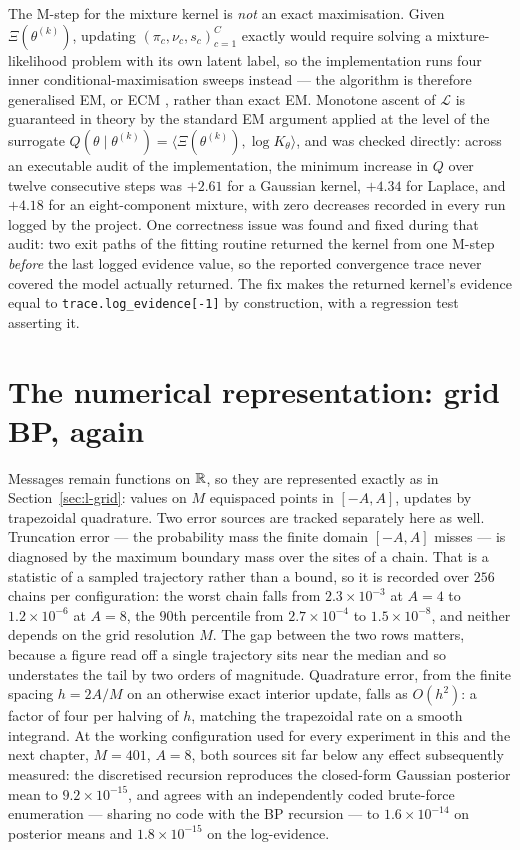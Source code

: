 The M-step for the mixture kernel is \emph{not} an exact maximisation. Given
$\Xi(\theta^{(k)})$, updating $(\pi_c,\nu_c,s_c)_{c=1}^C$ exactly would
require solving a mixture-likelihood problem with its own latent label, so the
implementation runs four inner conditional-maximisation sweeps instead --- the
algorithm is therefore generalised EM, or ECM \citep{meng1993maximum}, rather
than exact EM. Monotone ascent of $\mathcal L$ is guaranteed in theory by the
standard EM argument applied at the level of the surrogate $Q(\theta \mid
\theta^{(k)}) = \langle \Xi(\theta^{(k)}), \log K_\theta\rangle$, and was
checked directly: across an executable audit of the implementation, the
minimum increase in $Q$ over twelve consecutive steps was $+2.61$ for a
Gaussian kernel, $+4.34$ for Laplace, and $+4.18$ for an eight-component
mixture, with zero decreases recorded in every run logged by the project. One
correctness issue was found and fixed during that audit: two exit paths of
the fitting routine returned the kernel from one M-step \emph{before} the
last logged evidence value, so the reported convergence trace never covered
the model actually returned. The fix makes the returned kernel's evidence
equal to \texttt{trace.log\_evidence[-1]} by construction, with a regression
test asserting it.

\section{The numerical representation: grid BP, again}\label{sec:em-numerical}

Messages remain functions on $\mathbb{R}$, so they are represented exactly as in
Section~\ref{sec:l-grid}: values on $M$ equispaced points in $[-A,A]$, updates
by trapezoidal quadrature. Two error sources are tracked separately here as
well. Truncation error --- the probability mass the finite domain $[-A,A]$
misses --- is diagnosed by the maximum boundary mass over the sites of a chain.
That is a statistic of a sampled trajectory rather than a bound, so it is
recorded over $256$ chains per configuration: the worst chain falls from
$2.3\times10^{-3}$ at $A=4$ to $1.2\times10^{-6}$ at $A=8$, the $90$th
percentile from $2.7\times10^{-4}$ to $1.5\times10^{-8}$, and neither depends on
the grid resolution $M$. The gap between the two rows matters, because a figure
read off a single trajectory sits near the median and so understates the tail by
two orders of magnitude. Quadrature error, from the
finite spacing $h=2A/M$ on an otherwise exact interior update, falls as
$O(h^2)$: a factor of four per halving of $h$, matching the trapezoidal
rate on a smooth integrand. At the working configuration used for every
experiment in this and the next chapter, $M=401$, $A=8$, both sources sit far
below any effect subsequently measured: the discretised recursion reproduces
the closed-form Gaussian posterior mean to $9.2\times10^{-15}$, and agrees
with an independently coded brute-force enumeration --- sharing no code with
the BP recursion --- to $1.6\times10^{-14}$ on posterior means and
$1.8\times10^{-15}$ on the log-evidence.

